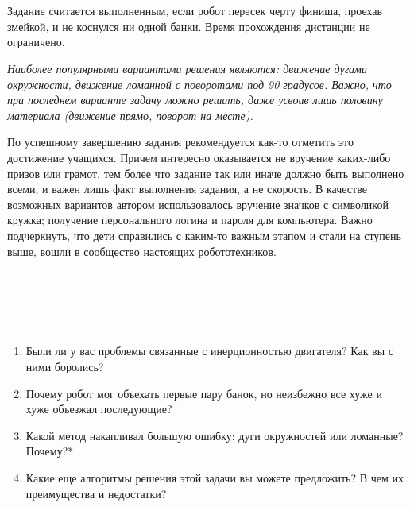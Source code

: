 \\\\

Задание считается выполненным, если робот пересек черту финиша, проехав змейкой, и не коснулся ни одной банки. Время прохождения дистанции не ограничено.

{\slshape Наиболее популярными вариантами решения являются: движение дугами окружности, движение ломанной с поворотами под 90 градусов. Важно, что при последнем варианте задачу можно решить, даже усвоив лишь половину материала (движение прямо, поворот на месте).
	
	По успешному завершению задания рекомендуется как-то отметить это достижение учащихся. Причем интересно оказывается не вручение каких-либо призов или грамот, тем более что задание так или иначе должно быть выполнено всеми, и важен лишь факт выполнения задания, а не скорость. В качестве возможных вариантов автором использовалось вручение значков с символикой кружка; получение персонального логина и пароля для компьютера. Важно подчеркнуть, что дети справились с каким-то важным этапом и стали на ступень выше, вошли в сообщество настоящих робототехников.}\\\\

{\hypertarget{lesson13x3}{}}\\\\

\begin{enumerate}
	\item Были ли у вас проблемы связанные с инерционностью двигателя? Как вы с ними боролись?
	\item Почему робот мог объехать первые пару банок, но неизбежно все хуже и хуже объезжал последующие?
	\item Какой метод накапливал большую ошибку: дуги окружностей или ломанные? Почему?*
	\item Какие еще алгоритмы решения этой задачи вы можете предложить? В чем их преимущества и недостатки?
\end{enumerate}